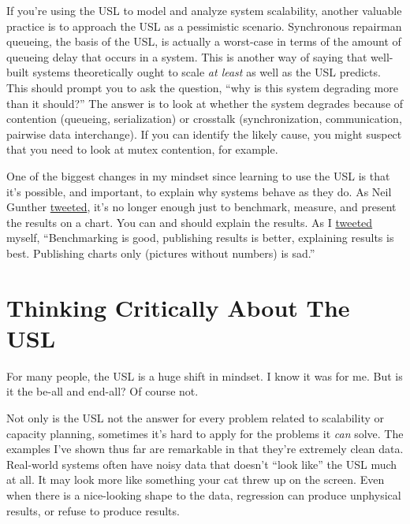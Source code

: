 \documentclass{vivid_layout}
\begin{document}
If you're using the USL to model and analyze system scalability, another
valuable practice is to approach the USL as a pessimistic scenario. Synchronous
repairman queueing, the basis of the USL, is actually a worst-case in terms of
the amount of queueing delay that occurs in a system. This is another way of
saying that well-built systems theoretically ought to scale {\itshape at least}
as well as the USL predicts. This should prompt you to ask the question, ``why
is this system degrading more than it should?'' The answer is to look at
whether the system degrades because of contention (queueing, serialization) or
crosstalk (synchronization, communication, pairwise data interchange). If you
can identify the likely cause, you might suspect that you need to look at mutex
contention, for example.

One of the biggest changes in my mindset since learning to use the USL is that
it's possible, and important, to explain why systems behave as they do. As Neil
Gunther \href{https://twitter.com/DrQz/status/659086348729499649}{tweeted}, it's
no longer enough just to benchmark, measure, and present the results on a chart.
You can and should explain the results. As I
\href{https://twitter.com/xaprb/status/657354190109458433}{tweeted} myself,
``Benchmarking is good, publishing results is better, explaining results is
best. Publishing charts only (pictures without numbers) is sad.''

\section{Thinking Critically About The USL}

For many people, the USL is a huge shift in mindset. I know it was for me. But
is it the be-all and end-all? Of course not.

Not only is the USL not the answer for every problem related to scalability
or capacity planning, sometimes it's hard to apply for the problems it
{\itshape can} solve. The examples I've shown thus far are remarkable in that
they're extremely clean data. Real-world systems often have noisy data that
doesn't ``look like'' the USL much at all. It may look more like something your
cat threw up on the screen. Even when there is a nice-looking shape to the data,
regression can produce unphysical results, or refuse to produce results.
\end{document}
